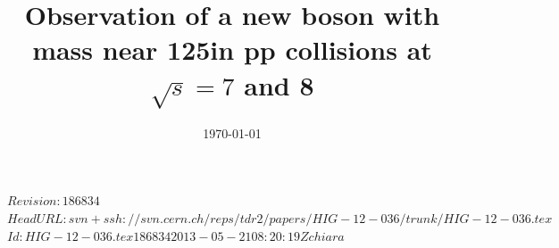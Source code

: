 \documentclass[11pt,twoside,a4paper,cmspaper,final,collab]{cms-tdr}
\begin{document}



\RCS$Revision: 186834 $
\RCS$HeadURL: svn+ssh://svn.cern.ch/reps/tdr2/papers/HIG-12-036/trunk/HIG-12-036.tex $
\RCS$Id: HIG-12-036.tex 186834 2013-05-21 08:20:19Z chiara $

\newlength\cmsFigWidth
{}%
  {\setlength{}}
\newlength\cmsFigWideWidth
{}%
  {\setlength{}}
%
  {\providecommand{\cmsRight}{right}}
\newcommand{\re}{\ensuremath{\cmsSymbolFace{e}}}

\providecommand{\Mjj}{\ensuremath{\mathit{m}(\mathrm{jj})}}
\providecommand{\ZllH}{\ensuremath{\cPZ(\ell\ell)\PH}}
\providecommand{\WlnH}{\ensuremath{\PW(\ell\cPgn)\PH}}
\providecommand\WtoLN {\ensuremath{\PW\to\ell\cPgn}}
\providecommand{\ZtoNN}{\ensuremath{\cPZ\to\cPgn\cPagn}}
\providecommand{\ZtoLL}{\ensuremath{\cPZ\to\ell\ell}}
\providecommand{\HBB}{\ensuremath{\PH\to \cPqb\cPqb}}
\providecommand{\ptjj}{\ensuremath{{\pt}(\mathrm{jj})}}
\providecommand{\dRJJ}{\ensuremath{\Delta R(\mathrm{j_1,j_2})}}
\providecommand{\dEtaJJ}{\ensuremath{|\Delta \eta(\mathrm{jj})|}}
\providecommand\dphiVH {\ensuremath{\Delta\phi(\mathrm{V,}\PH)}}
\providecommand{\dphiMJ}{\ensuremath{\Delta\phi(\mathrm{\MET,j})}}
\providecommand{\Naj}{\ensuremath{N_{\mathrm{aj}}}}
\providecommand{\Nal}{\ensuremath{N_{\mathrm{al}}}}
\title{Observation of a new boson with mass near  125\GeV in pp collisions at $\sqrt{s} = 7$ and 8\TeV}






\date{\today}
\end{document}
